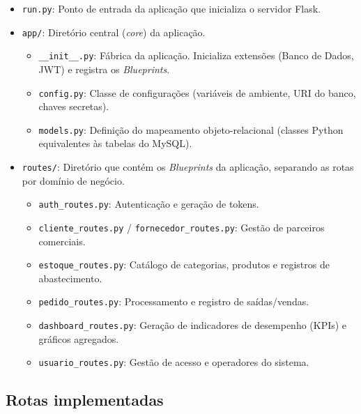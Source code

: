 \begin{itemize}
    \item \texttt{run.py}: Ponto de entrada da aplicação que inicializa o servidor Flask.

    \item \texttt{app/}: Diretório central (\textit{core}) da aplicação.

    \begin{itemize}
        \item \texttt{\_\_init\_\_.py}: Fábrica da aplicação. Inicializa extensões (Banco de Dados, JWT) e registra os \textit{Blueprints}.

        \item \texttt{config.py}: Classe de configurações (variáveis de ambiente, URI do banco, chaves secretas).

        \item \texttt{models.py}: Definição do mapeamento objeto-relacional (classes Python equivalentes às tabelas do MySQL).
    \end{itemize}

    \item \texttt{routes/}: Diretório que contém os \textit{Blueprints} da aplicação, separando as rotas por domínio de negócio.

    \begin{itemize}
        \item \texttt{auth\_routes.py}: Autenticação e geração de tokens.

        \item \texttt{cliente\_routes.py} / \texttt{fornecedor\_routes.py}: Gestão de parceiros comerciais.

        \item \texttt{estoque\_routes.py}: Catálogo de categorias, produtos e registros de abastecimento.

        \item \texttt{pedido\_routes.py}: Processamento e registro de saídas/vendas.

        \item \texttt{dashboard\_routes.py}: Geração de indicadores de desempenho (KPIs) e gráficos agregados.

        \item \texttt{usuario\_routes.py}: Gestão de acesso e operadores do sistema.
    \end{itemize}
\end{itemize}

\subsection{Rotas implementadas}

